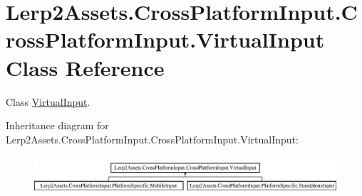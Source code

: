 \hypertarget{class_lerp2_assets_1_1_cross_platform_input_1_1_cross_platform_input_1_1_virtual_input}{}\section{Lerp2\+Assets.\+Cross\+Platform\+Input.\+Cross\+Platform\+Input.\+Virtual\+Input Class Reference}
\label{class_lerp2_assets_1_1_cross_platform_input_1_1_cross_platform_input_1_1_virtual_input}


Class \hyperlink{class_lerp2_assets_1_1_cross_platform_input_1_1_cross_platform_input_1_1_virtual_input}{Virtual\+Input}.  


Inheritance diagram for Lerp2\+Assets.\+Cross\+Platform\+Input.\+Cross\+Platform\+Input.\+Virtual\+Input\+:\begin{figure}[H]
\begin{center}
\leavevmode
\includegraphics[height=1.435897cm]{class_lerp2_assets_1_1_cross_platform_input_1_1_cross_platform_input_1_1_virtual_input}
\end{center}
\end{figure}
